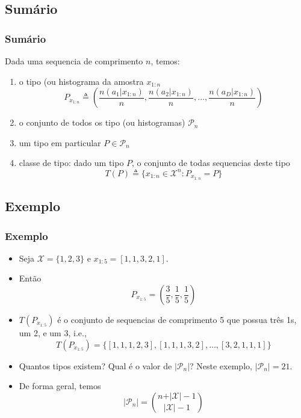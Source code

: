 \subsection{Sumário}
\begin{frame}[allowframebreaks]
  \frametitle{Sumário}
  Dada uma sequencia de comprimento $n$, temos:
  \begin{enumerate}
  \item o tipo (ou histograma da amostra $x_{1:n}$
        \begin{equation}
        P_{x_{1:n}} \triangleq \left( \frac{n(a_1|x_{1:n})}{n}, \frac{n(a_2|x_{1:n})}{n}, \ldots, \frac{n(a_D|x_{1:n})}{n} \right)
        \end{equation}
  \item o conjunto de todos os tipo (ou histogramas) $\mathcal{P}_n$
  \item um tipo em particular $P \in \mathcal{P}_n$
  \item classe de tipo: dado um tipo $P$, o conjunto de todas sequencias deste tipo
        \begin{equation}
        T(P) \triangleq \{ x_{1:n} \in \mathcal{X}^n : P_{x_{1:n}} = P \}
        \end{equation}
  \end{enumerate}
\end{frame}



\subsection{Exemplo}
\begin{frame}[allowframebreaks]
  \frametitle{Exemplo}
  \begin{itemize}
  \item Seja $\mathcal{X} = \{1,2,3\}$ e $x_{1:5} = [1,1,3,2,1]$.
  \item Então
	\begin{equation}
	P_{x_{1:5}} = \left( \frac{3}{5}, \frac{1}{5}, \frac{1}{5} \right)
	\end{equation}
  \item $T(P_{x_{1:5}})$ é o conjunto de sequencias de comprimento 5 que possua três 1s, um 2, e um 3, i.e.,
	\begin{equation}
	T(P_{x_{1:5}}) = \{ [1,1,1,2,3], [1,1,1,3,2], \ldots , [3,2,1,1,1] \}
	\end{equation}
  \item Quantos tipos existem? Qual é o valor de $\vert \mathcal{P}_n \vert$? Neste exemplo, $\vert \mathcal{P}_n \vert = 21$.
  \item De forma geral, temos
	\begin{equation}
	\label{eq:number-of-types}
	\vert \mathcal{P}_n \vert = {n + \vert \mathcal{X} \vert - 1 \choose \vert \mathcal{X} \vert - 1}
        \end{equation}
  \end{itemize}
\end{frame}

